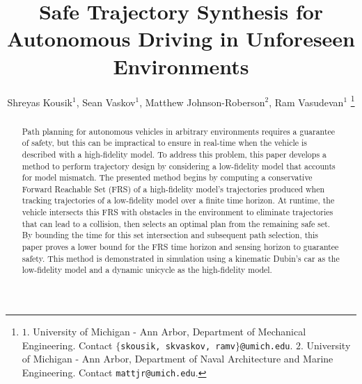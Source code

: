 \documentclass[letterpaper, 10 pt, conference]{ieeeconf}
\title{Safe Trajectory Synthesis for Autonomous Driving in Unforeseen Environments}
\author{Shreyas Kousik$^1$, Sean Vaskov$^1$, Matthew Johnson-Roberson$^2$, Ram Vasudevan$^1$%
\thanks{$1$. University of Michigan - Ann Arbor, Department of Mechanical Engineering. Contact \texttt{$\{$skousik, skvaskov, ramv$\}$@umich.edu}.\newline
\indent$2$. University of Michigan - Ann Arbor, Department of Naval Architecture and Marine Engineering. Contact \texttt{mattjr@umich.edu}.}}
\providecommand{\1}{\ensuremath \mathbbm{1}}
\begin{document}
\maketitle
\thispagestyle{empty}
\pagestyle{empty}

\begin{abstract}
Path planning for autonomous vehicles in arbitrary environments requires a guarantee of safety, but this can be impractical to ensure in real-time when the vehicle is described with a high-fidelity model.
To address this problem, this paper develops a method to perform trajectory design by considering a low-fidelity model that accounts for model mismatch.
The presented method begins by computing a conservative Forward Reachable Set (FRS) of a high-fidelity model's trajectories produced when tracking trajectories of a low-fidelity model over a finite time horizon.
At runtime, the vehicle intersects this FRS with obstacles in the environment to eliminate trajectories that can lead to a collision, then selects an optimal plan from the remaining safe set.
By bounding the time for this set intersection and subsequent path selection, this paper proves a lower bound for the FRS time horizon and sensing horizon to guarantee safety.
This method is demonstrated in simulation using a kinematic Dubin's car as the low-fidelity model and a dynamic unicycle as the high-fidelity model.
\end{abstract}










\end{document}
